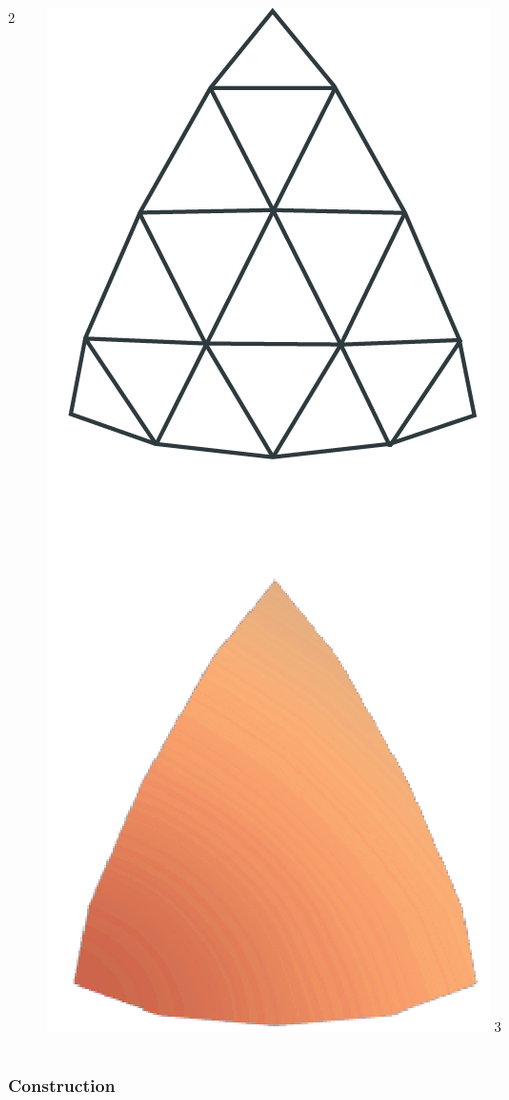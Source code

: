 \begin{frame}
\begin{columns}
\begin{column}[b]{0.22\textwidth}
\begin{center}
					\small{2}
				\end{center}	
			\end{column}
			\begin{column}[b]{0.22\textwidth}
				\begin{center}
					\includegraphics[width=\textwidth]{./img/1_single/lod_lod3.png}	
					\small{3}
				\end{center}	
			\end{column}
		\end{columns}
	\end{frame}	

	\begin{frame}
		\frametitle{Construction}
	\end{frame}	